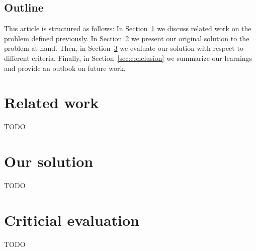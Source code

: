 \documentclass{IEEEtran}
\begin{document}
    \subsection*{Outline}
    This article is structured as follows:
    In Section~\ref{sec:differentiation} we discuss related work on the problem defined previously.
    In Section~\ref{sec:contribution} we present our original solution to the problem at hand.
    Then, in Section~\ref{sec:evaluation} we evaluate our solution with respect to different criteria.
    Finally, in Section~\ref{sec:conclusion} we summarize our learnings and provide an outlook on future work.
    
    \section{Related work}
    \label{sec:differentiation}
    TODO

    \section{Our solution}
    \label{sec:contribution}
    TODO 

    \section{Criticial evaluation}
    \label{sec:evaluation}
    TODO
\end{document}
